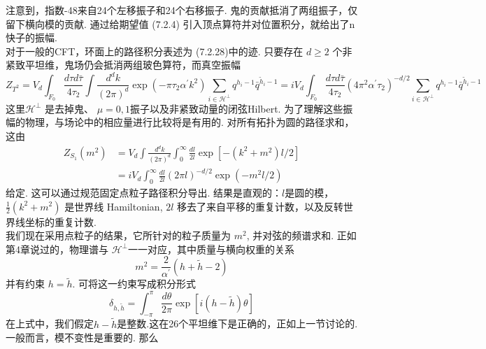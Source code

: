 注意到，指数-48来自24个左移振子和24个右移振子. 鬼的贡献抵消了两组振子，仅留下横向模的贡献. 通过给期望值  (7.2.4) 引入顶点算符并对位置积分，就给出了n快子的振幅. \\
对于一般的CFT，环面上的路径积分表述为 (7.2.28)中的迹. 只要存在 $d \geq 2$ 个非紧致平坦维，鬼场仍会抵消两组玻色算符，而真空振幅
\begin{subequations}
\begin{equation}
Z_{T^{2}} =V_{d} \int_{F_{0}} \frac{d \tau d \bar{\tau}}{4 \tau_{2}} \int \frac{d^{d} k}{(2 \pi)^{d}} \exp \left(-\pi \tau_{2} \alpha^{\prime} k^{2}\right) \sum_{i \in \mathscr{H}^{\perp}} q^{h_{i}-1} \bar{q}^{\tilde{h}_{i}-1} 
\end{equation}
\begin{equation}
=i V_{d} \int_{F_{0}} \frac{d \tau d \bar{\tau}}{4 \tau_{2}}\left(4 \pi^{2} \alpha^{\prime} \tau_{2}\right)^{-d / 2} \sum_{i \in \mathscr{H}^{\perp}} q^{h_{i}-1} \bar{q}^{\tilde{h}_{i}-1}
\end{equation}		
\end{subequations}
这里$\mathscr{H}^{\perp}$ 是去掉鬼、 $\mu=0,1$振子以及非紧致动量的闭弦Hilbert. 为了理解这些振幅的物理，与场论中的相应量进行比较将是有用的. 对所有拓扑为圆的路径求和，这由
\begin{equation}
	\begin{aligned}
		Z_{S_{1}}\left(m^{2}\right) &=V_{d} \int \frac{d^{d} k}{(2 \pi)^{d}} \int_{0}^{\infty} \frac{d l}{2 l} \exp \left[-\left(k^{2}+m^{2}\right) l / 2\right] \\
		&=i V_{d} \int_{0}^{\infty} \frac{d l}{2 l}(2 \pi l)^{-d / 2} \exp \left(-m^{2} l / 2\right)
	\end{aligned}
\end{equation}
给定. 这可以通过规范固定点粒子路径积分导出. 结果是直观的：$l$是圆的模， $\frac{1}{2}\left(k^{2}+m^{2}\right)$ 是世界线 Hamiltonian, $2 l$ 移去了来自平移的重复计数，以及反转世界线坐标的重复计数.\\
我们现在采用点粒子的结果，它所针对的粒子质量为 $m^{2}$, 并对弦的频谱求和. 正如第4章说过的，物理谱与 $\mathscr{H}^{\perp}$一一对应，其中质量与横向权重的关系
\begin{equation}
	m^{2}=\frac{2}{\alpha^{\prime}}(h+\tilde{h}-2)
\end{equation}
并有约束 $h=\tilde{h} $. 可将这一约束写成积分形式
\begin{equation}
	\delta_{h, \tilde{h}}=\int_{-\pi}^{\pi} \frac{d \theta}{2 \pi} \exp [i(h-\tilde{h}) \theta]
\end{equation}
在上式中，我们假定$h-\tilde{h}$是整数.这在26个平坦维下是正确的，正如上一节讨论的. 一般而言，模不变性是重要的. 那么
